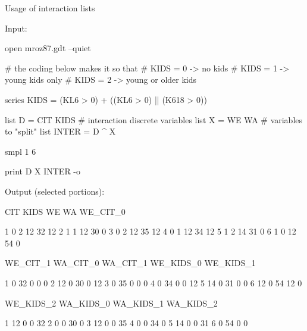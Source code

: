 \begin{script}[ht]
  \caption{Usage of interaction lists}
  \label{ex:interact_list}
Input:
\begin{scodebit}
open mroz87.gdt --quiet

# the coding below makes it so that
# KIDS = 0 -> no kids
# KIDS = 1 -> young kids only
# KIDS = 2 -> young or older kids

series KIDS = (KL6 > 0) + ((KL6 > 0) || (K618 > 0))

list D = CIT KIDS # interaction discrete variables 
list X = WE WA    # variables to "split"
list INTER = D ^ X

smpl 1 6

print D X INTER -o
\end{scodebit}
Output (selected portions):
\begin{scodebit}
           CIT         KIDS           WE           WA     WE_CIT_0

1            0            2           12           32           12
2            1            1           12           30            0
3            0            2           12           35           12
4            0            1           12           34           12
5            1            2           14           31            0
6            1            0           12           54            0

      WE_CIT_1     WA_CIT_0     WA_CIT_1    WE_KIDS_0    WE_KIDS_1

1            0           32            0            0            0
2           12            0           30            0           12
3            0           35            0            0            0
4            0           34            0            0           12
5           14            0           31            0            0
6           12            0           54           12            0

     WE_KIDS_2    WA_KIDS_0    WA_KIDS_1    WA_KIDS_2

1           12            0            0           32
2            0            0           30            0
3           12            0            0           35
4            0            0           34            0
5           14            0            0           31
6            0           54            0            0

\end{scodebit}
\end{script}




